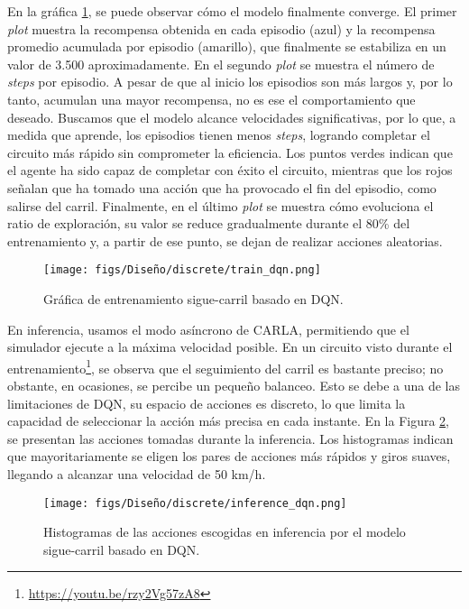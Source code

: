 En la gráfica \ref{fig:train_dqn}, se puede observar cómo el modelo finalmente converge. El primer \textit{plot} muestra la recompensa obtenida en cada episodio (azul) y la recompensa promedio acumulada por episodio (amarillo), que finalmente se estabiliza en un valor de 3.500 aproximadamente. En el segundo \textit{plot} se muestra el número de \textit{steps} por episodio. A pesar de que al inicio los episodios son más largos y, por lo tanto, acumulan una mayor recompensa, no es ese el comportamiento que deseado. Buscamos que el modelo alcance velocidades significativas, por lo que, a medida que aprende, los episodios tienen menos \textit{steps}, logrando completar el circuito más rápido sin comprometer la eficiencia. Los puntos verdes indican que el agente ha sido capaz de completar con éxito el circuito, mientras que los rojos señalan que ha tomado una acción que ha provocado el fin del episodio, como salirse del carril. Finalmente, en el último \textit{plot} se muestra cómo evoluciona el ratio de exploración, su valor se reduce gradualmente durante el 80\% del entrenamiento y, a partir de ese punto, se dejan de realizar acciones aleatorias.
\begin{figure}[ht]
\centering
\texttt{[image: figs/Diseño/discrete/train\_dqn.png]}
\caption{Gráfica de entrenamiento sigue-carril basado en \ac{DQN}.}
\label{fig:train_dqn}
\end{figure}

En inferencia, usamos el modo asíncrono de CARLA, permitiendo que el simulador ejecute a la máxima velocidad posible. En un circuito visto durante el entrenamiento\footnote{\url{https://youtu.be/rzy2Vg57zA8}}, se observa que el seguimiento del carril es bastante preciso; no obstante, en ocasiones, se percibe un pequeño balanceo. Esto se debe a una de las limitaciones de \ac{DQN}, su espacio de acciones es discreto, lo que limita la capacidad de seleccionar la acción más precisa en cada instante. En la Figura \ref{fig:inference_dqn}, se presentan las acciones tomadas durante la inferencia. Los histogramas indican que mayoritariamente se eligen los pares de acciones más rápidos y giros suaves, llegando a alcanzar una velocidad de 50 km/h.

\begin{figure}[ht]
\centering
\texttt{[image: figs/Diseño/discrete/inference\_dqn.png]}
\caption{Histogramas de las acciones escogidas en inferencia por el modelo sigue-carril basado en \ac{DQN}.}
\label{fig:inference_dqn}
\end{figure}

